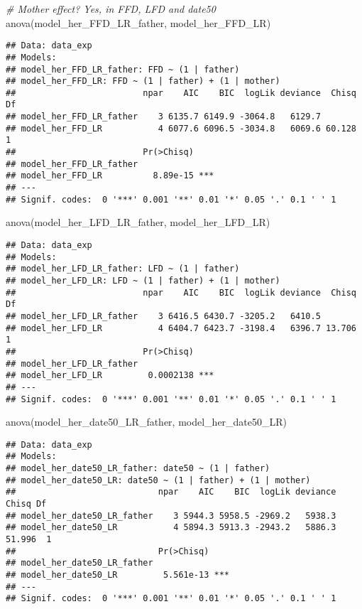 \documentclass[
]{article}
\newenvironment{Shaded}{\begin{snugshade}}{\end{snugshade}}
\newcommand{\CommentTok}[1]{\textcolor[rgb]{0.56,0.35,0.01}{\textit{#1}}}
\newcommand{\FunctionTok}[1]{\textcolor[rgb]{0.00,0.00,0.00}{#1}}
\newcommand{\NormalTok}[1]{#1}
\begin{document}
\begin{Shaded}
\begin{Highlighting}[]
\CommentTok{\# Mother effect? Yes, in FFD, LFD and date50}
\FunctionTok{anova}\NormalTok{(model\_her\_FFD\_LR\_father, model\_her\_FFD\_LR)}
\end{Highlighting}
\end{Shaded}

\begin{verbatim}
## Data: data_exp
## Models:
## model_her_FFD_LR_father: FFD ~ (1 | father)
## model_her_FFD_LR: FFD ~ (1 | father) + (1 | mother)
##                         npar    AIC    BIC  logLik deviance  Chisq Df
## model_her_FFD_LR_father    3 6135.7 6149.9 -3064.8   6129.7          
## model_her_FFD_LR           4 6077.6 6096.5 -3034.8   6069.6 60.128  1
##                         Pr(>Chisq)    
## model_her_FFD_LR_father               
## model_her_FFD_LR          8.89e-15 ***
## ---
## Signif. codes:  0 '***' 0.001 '**' 0.01 '*' 0.05 '.' 0.1 ' ' 1
\end{verbatim}

\begin{Shaded}
\begin{Highlighting}[]
\FunctionTok{anova}\NormalTok{(model\_her\_LFD\_LR\_father, model\_her\_LFD\_LR)}
\end{Highlighting}
\end{Shaded}

\begin{verbatim}
## Data: data_exp
## Models:
## model_her_LFD_LR_father: LFD ~ (1 | father)
## model_her_LFD_LR: LFD ~ (1 | father) + (1 | mother)
##                         npar    AIC    BIC  logLik deviance  Chisq Df
## model_her_LFD_LR_father    3 6416.5 6430.7 -3205.2   6410.5          
## model_her_LFD_LR           4 6404.7 6423.7 -3198.4   6396.7 13.706  1
##                         Pr(>Chisq)    
## model_her_LFD_LR_father               
## model_her_LFD_LR         0.0002138 ***
## ---
## Signif. codes:  0 '***' 0.001 '**' 0.01 '*' 0.05 '.' 0.1 ' ' 1
\end{verbatim}

\begin{Shaded}
\begin{Highlighting}[]
\FunctionTok{anova}\NormalTok{(model\_her\_date50\_LR\_father, model\_her\_date50\_LR)}
\end{Highlighting}
\end{Shaded}

\begin{verbatim}
## Data: data_exp
## Models:
## model_her_date50_LR_father: date50 ~ (1 | father)
## model_her_date50_LR: date50 ~ (1 | father) + (1 | mother)
##                            npar    AIC    BIC  logLik deviance  Chisq Df
## model_her_date50_LR_father    3 5944.3 5958.5 -2969.2   5938.3          
## model_her_date50_LR           4 5894.3 5913.3 -2943.2   5886.3 51.996  1
##                            Pr(>Chisq)    
## model_her_date50_LR_father               
## model_her_date50_LR         5.561e-13 ***
## ---
## Signif. codes:  0 '***' 0.001 '**' 0.01 '*' 0.05 '.' 0.1 ' ' 1
\end{verbatim}
\end{document}
